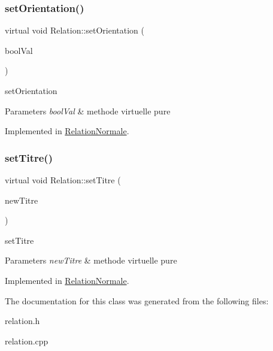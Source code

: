 \mbox{\label{class_relation_a708a16e5b0dd280e64832ca1d042cd96}} 
\subsubsection{\texorpdfstring{set\+Orientation()}{setOrientation()}}
{\footnotesize\ttfamily virtual void Relation\+::set\+Orientation (\begin{DoxyParamCaption}\item[{bool}]{bool\+Val }\end{DoxyParamCaption})\hspace{0.3cm}{\ttfamily [pure virtual]}}



set\+Orientation 


\begin{DoxyParams}{Parameters}
{\em bool\+Val} & methode virtuelle pure \\
\hline
\end{DoxyParams}


Implemented in \hyperlink{class_relation_normale_a1e660e212501ad0ddb38dc9949735cf2}{Relation\+Normale}.

\mbox{\label{class_relation_a1c08a802796f5fccaa5732ec1a96e542}} 
\subsubsection{\texorpdfstring{set\+Titre()}{setTitre()}}
{\footnotesize\ttfamily virtual void Relation\+::set\+Titre (\begin{DoxyParamCaption}\item[{const Q\+String \&}]{new\+Titre }\end{DoxyParamCaption})\hspace{0.3cm}{\ttfamily [pure virtual]}}



set\+Titre 


\begin{DoxyParams}{Parameters}
{\em new\+Titre} & methode virtuelle pure \\
\hline
\end{DoxyParams}


Implemented in \hyperlink{class_relation_normale_abd0076a23f702ced9af181a0f046652c}{Relation\+Normale}.



The documentation for this class was generated from the following files\+:\begin{DoxyCompactItemize}
\item 
relation.\+h\item 
relation.\+cpp\end{DoxyCompactItemize}
